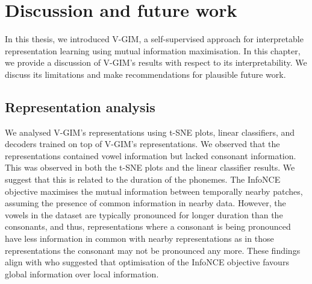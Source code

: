 \chapter{Discussion and future work} \label{cha:6}

	
In this thesis, we introduced V-GIM, a self-supervised approach for interpretable representation learning using mutual information maximisation. In this chapter, we provide a discussion of V-GIM's results with respect to its interpretability. We discuss its limitations and make recommendations for plausible future work.




\section{Representation analysis}
	
	We analysed V-GIM's representations using t-SNE plots, linear classifiers, and decoders trained on top of V-GIM's representations. We observed that the representations contained vowel information but lacked consonant information. This was observed in both the t-SNE plots and the linear classifier results. We suggest that this is related to the duration of the phonemes. The InfoNCE objective maximises the mutual information between temporally nearby patches, assuming the presence of common information in nearby data. However, the vowels in the dataset are typically pronounced for longer duration than the consonants, and thus, representations where a consonant is being pronounced have less information in common with nearby representations as in those representations the consonant may not be pronounced any more. These findings align with \cite{lowePuttingEndEndtoEnd2020} who suggested that optimisation of the InfoNCE objective favours global information over local information. 
	
